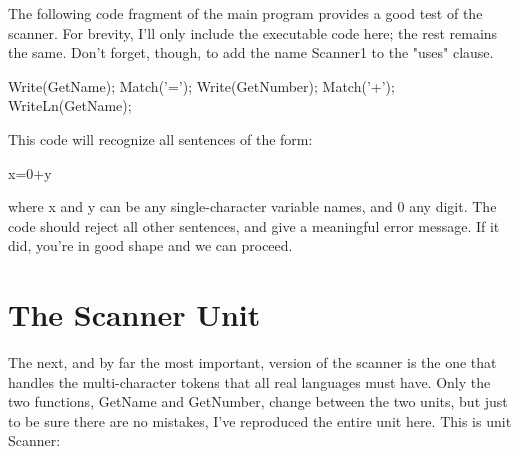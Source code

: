 \documentclass[float=false, crop=false]{standalone}
\begin{document}
The following code fragment of the main program provides a good test of the
scanner. For brevity, I'll only include the executable code here; the rest
remains the same. Don't forget, though, to add the name Scanner1 to the "uses"
clause.

	Write(GetName);
	Match('=');
	Write(GetNumber);
	Match('+');
	WriteLn(GetName);

This code will recognize all sentences of the form:

	x=0+y

where x and y can be any single-character variable names, and 0 any digit. The
code should reject all other sentences, and give a meaningful error message. If
it did, you're in good shape and we can proceed.


\section{The Scanner Unit}

The next, and by far the most important, version of the scanner is the one that
handles the multi-character tokens that all real languages must have. Only the
two functions, GetName and GetNumber, change between the two units, but just to
be sure there are no mistakes, I've reproduced the entire unit here. This is
unit Scanner:
\end{document}
